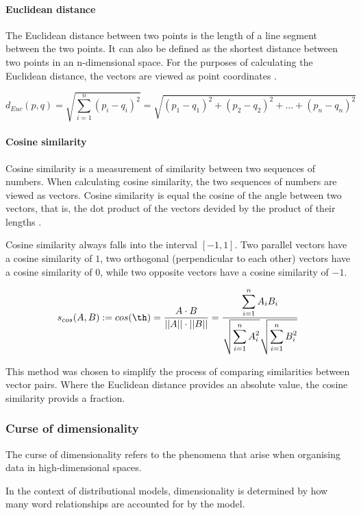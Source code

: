 \documentclass[14pt, a4paper]{extreport}
\begin{document}
\paragraph{Euclidean distance}

The Euclidean distance between two points is the length of a line segment between the two points. It can also be defined as the shortest distance between two points in an n-dimensional space. For the purposes of calculating the Euclidean distance, the vectors are viewed as point coordinates \parencite{oduntan}.

\medskip
\[d_{Euc}(p, q) = \sqrt{\displaystyle\sum_{i=1}^{n} (p_i - q_i)^2} = \sqrt{(p_1 - q_1)^2 + (p_2 - q_2)^2 + ... + (p_n - q_n)^2}\]

\paragraph{Cosine similarity}

Cosine similarity is a measurement of similarity between two sequences of numbers. When calculating cosine similarity, the two sequences of numbers are viewed as vectors. Cosine similarity is equal the cosine of the angle between two vectors, that is, the dot product of the vectors devided by the product of their lengths \parencite{oduntan}.

Cosine similarity always falls into the interval \([-1, 1]\). Two parallel vectors have 
a cosine similarity of \(1\), two orthogonal (perpendicular to each other) vectors have a cosine similarity of \(0\), while two opposite vectors have a cosine similarity of \(-1\).

\medskip
\[s_{cos}(A, B) := cos(\th) = \frac {A \cdot B}{||A|| \cdot ||B||} = \frac {\displaystyle\sum_{i=1}^{n} A_i B_i}{\sqrt{\displaystyle\sum_{i=1}^{n} A_i^2} \sqrt{\displaystyle\sum_{i=1}^{n} B_i^2}}\]
\medskip

This method was chosen to simplify the process of comparing similarities between vector pairs. Where the Euclidean distance provides an absolute value, the cosine similarity provids a fraction.

    \subsubsection{Curse of dimensionality}
The curse of dimensionality refers to the phenomena that arise when organising data in high-dimensional spaces.

In the context of distributional models, dimensionality is determined by how many word relationships are accounted for by the model.
\end{document}
